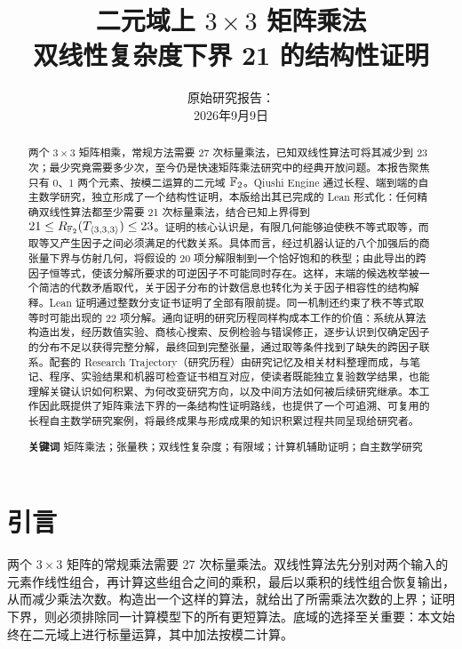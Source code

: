 \documentclass[11pt,a4paper]{article}
\title{二元域上 $3\times3$ 矩阵乘法\\双线性复杂度下界 21 的结构性证明}
\date{原始研究报告：\\2026年9月9日}
\begin{document}
\maketitle
\thispagestyle{plain}
\begin{abstract}
两个 $3\times3$ 矩阵相乘，常规方法需要 27 次标量乘法，已知双线性算法可将其减少到 23 次；最少究竟需要多少次，至今仍是快速矩阵乘法研究中的经典开放问题。本报告聚焦只有 0、1 两个元素、按模二运算的二元域 $\mathbb{F}_2$。Qiushi Engine 通过长程、端到端的自主数学研究，独立形成了一个结构性证明，本版给出其已完成的 Lean 形式化：任何精确双线性算法都至少需要 21 次标量乘法，结合已知上界得到 $21\le R_{\mathbb{F}_2}(T_{\langle3,3,3\rangle})\le23$。证明的核心认识是，有限几何能够迫使秩不等式取等，而取等又产生因子之间必须满足的代数关系。具体而言，经过机器认证的八个加强后的商张量下界与仿射几何，将假设的 20 项分解限制到一个恰好饱和的秩型；由此导出的跨因子恒等式，使该分解所要求的可逆因子不可能同时存在。这样，末端的候选枚举被一个简洁的代数矛盾取代，关于因子分布的计数信息也转化为关于因子相容性的结构解释。Lean 证明通过整数分支证书证明了全部有限前提。同一机制还约束了秩不等式取等时可能出现的 22 项分解。通向证明的研究历程同样构成本工作的价值：系统从算法构造出发，经历数值实验、商核心搜索、反例检验与错误修正，逐步认识到仅确定因子的分布不足以获得完整分解，最终回到完整张量，通过取等条件找到了缺失的跨因子联系。配套的 Research Trajectory（研究历程）由研究记忆及相关材料整理而成，与笔记、程序、实验结果和机器可检查证书相互对应，使读者既能独立复验数学结果，也能理解关键认识如何积累、为何改变研究方向，以及中间方法如何被后续研究继承。本工作因此既提供了矩阵乘法下界的一条结构性证明路线，也提供了一个可追溯、可复用的长程自主数学研究案例，将最终成果与形成成果的知识积累过程共同呈现给研究者。
\par\smallskip\noindent\textbf{关键词}\quad
矩阵乘法；张量秩；双线性复杂度；有限域；计算机辅助证明；自主数学研究
\end{abstract}
{\small{}\tableofcontents\par}
\clearpage

\section{引言}

两个 $3\times3$ 矩阵的常规乘法需要 27 次标量乘法。双线性算法先分别对两个输入的元素作线性组合，再计算这些组合之间的乘积，最后以乘积的线性组合恢复输出，从而减少乘法次数。构造出一个这样的算法，就给出了所需乘法次数的上界；证明下界，则必须排除同一计算模型下的所有更短算法。底域的选择至关重要：本文始终在二元域上进行标量运算，其中加法按模二计算。
\end{document}
